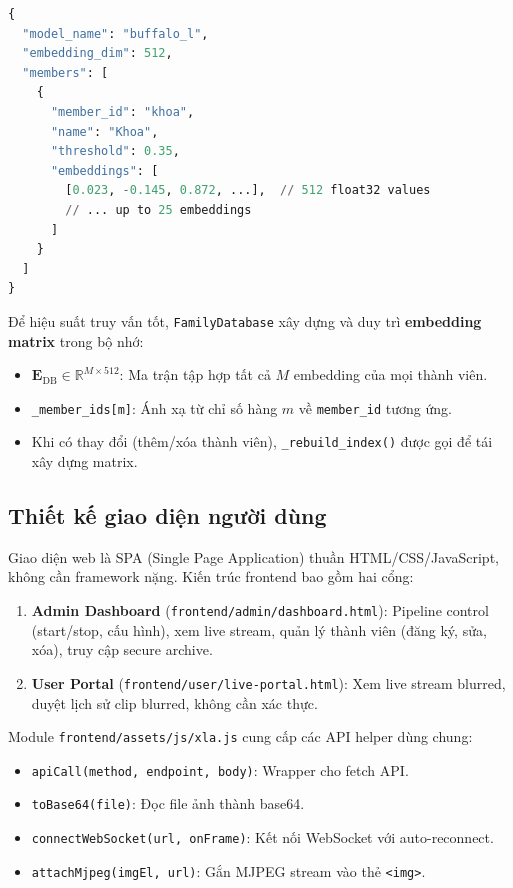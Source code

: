 \begin{lstlisting}[language=Python, caption={Cấu trúc dữ liệu face database}]
{
  "model_name": "buffalo_l",
  "embedding_dim": 512,
  "members": [
    {
      "member_id": "khoa",
      "name": "Khoa",
      "threshold": 0.35,
      "embeddings": [
        [0.023, -0.145, 0.872, ...],  // 512 float32 values
        // ... up to 25 embeddings
      ]
    }
  ]
}
\end{lstlisting}

\medskip
Để hiệu suất truy vấn tốt, \texttt{FamilyDatabase} xây dựng và duy trì \textbf{embedding matrix} trong bộ nhớ:
\begin{itemize}
    \item $\mathbf{E}_{\text{DB}} \in \mathbb{R}^{M \times 512}$: Ma trận tập hợp tất cả $M$ embedding của mọi thành viên.
    \item \texttt{\_member\_ids[m]}: Ánh xạ từ chỉ số hàng $m$ về \texttt{member\_id} tương ứng.
    \item Khi có thay đổi (thêm/xóa thành viên), \texttt{\_rebuild\_index()} được gọi để tái xây dựng matrix.
\end{itemize}

\subsection{Thiết kế giao diện người dùng}
\label{subsec:ui}

Giao diện web là SPA (Single Page Application) thuần HTML/CSS/JavaScript, không cần framework nặng. Kiến trúc frontend bao gồm hai cổng:

\begin{enumerate}[1.]
    \item \textbf{Admin Dashboard} (\texttt{frontend/admin/dashboard.html}): Pipeline control (start/stop, cấu hình), xem live stream, quản lý thành viên (đăng ký, sửa, xóa), truy cập secure archive.
    
    \item \textbf{User Portal} (\texttt{frontend/user/live-portal.html}): Xem live stream blurred, duyệt lịch sử clip blurred, không cần xác thực.
\end{enumerate}

\medskip
Module \texttt{frontend/assets/js/xla.js} cung cấp các API helper dùng chung:
\begin{itemize}
    \item \texttt{apiCall(method, endpoint, body)}: Wrapper cho fetch API.
    \item \texttt{toBase64(file)}: Đọc file ảnh thành base64.
    \item \texttt{connectWebSocket(url, onFrame)}: Kết nối WebSocket với auto-reconnect.
    \item \texttt{attachMjpeg(imgEl, url)}: Gắn MJPEG stream vào thẻ \texttt{<img>}.
\end{itemize}

\medskip
